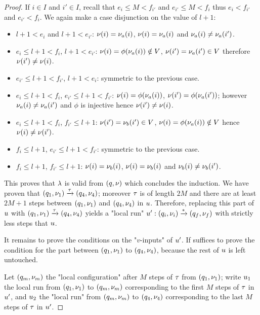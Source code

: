 \begin{proof}
	If $i \in I$ and $i' \in I$, recall that $e_i \leq M < f_{i'}$ and $e_{i'} \leq M < f_i$ thus $e_i < f_{i'}$ and $e_{i'}< f_i$. We again make a case disjunction on the value of $l+1$:
	\begin{itemize}
		\item $l+1<e_i$ and $l+1 <e_{i'}$: $\nu(i)= \nu_a(i)$, $\nu(i)= \nu_a(i)$ and $\nu_a(i) \ne \nu_a(i')$. 
		\item $e_i \leq l+1 < f_i$, $l+1<e_{i'}$: $\nu(i) = \phi(\nu_a(i)) \notin V$, $\nu(i') = \nu_a(i') \in V$ therefore $\nu(i') \ne \nu(i)$.
		\item $e_{i'} \leq l+1 < f_{i'}$, $l+1<e_{i}$: symmetric to the previous case.
		\item $e_i \leq l+1 < f_i$, $e_{i'} \leq l+1 < f_{i'}$: $\nu(i) = \phi(\nu_a(i))$, $\nu(i') = \phi(\nu_a(i'))$; however $\nu_a(i) \ne \nu_a(i')$ and $\phi$ is injective hence $\nu(i') \ne \nu(i)$.
		\item $e_i \leq l+1 < f_i$, $f_{i'} \leq l+1$: $\nu(i') = \nu_b(i') \in V$, $\nu(i) = \phi(\nu_a(i)) \notin V$ hence $\nu(i) \ne \nu(i')$.
		\item $f_i \leq l+1$, $e_{i'} \leq l+1 < f_{i'}$: symmetric to the previous case.
		\item $f_i \leq l+1$, $f_{i'} \leq l+1$: $\nu(i)= \nu_b(i)$, $\nu(i)= \nu_b(i)$ and $\nu_b(i) \ne \nu_b(i')$. 
	\end{itemize}
	
	This proves that $\lambda$ is valid from $(q,\nu)$ which concludes the induction. 
	We have proven that $(q_1,\nu_1) \xrightarrow{\tau} (q_4, \nu_4)$; moreover $\tau$ is of length $2M$ and there are at least $2M+1$ steps between $(q_1,\nu_1)$ and $(q_4, \nu_4)$ in $u$. Therefore, replacing this part of $u$ with $(q_1,\nu_1) \xrightarrow{\tau} (q_4, \nu_4)$ yields a "local run" $u': (q_i, \nu_i) \xrightarrow{*} (q_f,\nu_f)$ with strictly less steps that $u$. 
	
	It remains to prove the conditions on the "$v$-inputs" of $u'$. If suffices to prove the condition for the part between $(q_1, \nu_1)$ to $(q_4, \nu_4)$,
	because the rest of $u$ is left untouched. 
	
	Let $(q_m, \nu_m)$ the "local configuration" after $M$ steps of $\tau$ from $(q_1, \nu_1)$; write $u_1$ the local run from $(q_1,\nu_1)$ to $(q_m, \nu_m)$ corresponding to the first $M$ steps of $\tau$ in $u'$, and $u_2$ the "local run" from $(q_m, \nu_m)$ to $(q_4, \nu_4)$ corresponding to the last $M$ steps of $\tau$ in $u'$.  
	

\end{proof}
